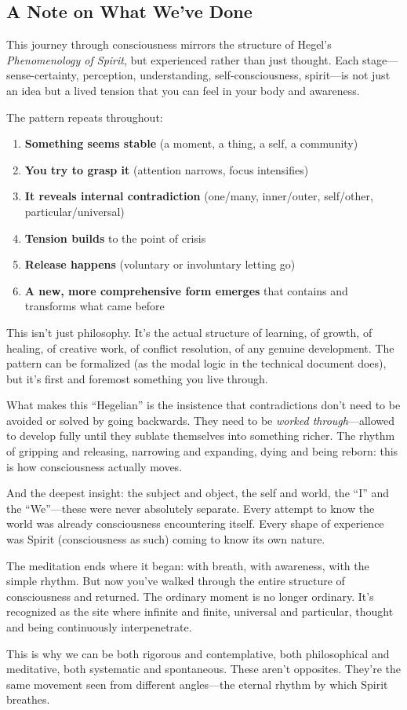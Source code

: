 \subsection{A Note on What We've Done}\label{a-note-on-what-weve-done}

This journey through consciousness mirrors the structure of Hegel's \emph{Phenomenology of Spirit}, but experienced rather than just thought. Each stage---sense-certainty, perception, understanding, self-consciousness, spirit---is not just an idea but a lived tension that you can feel in your body and awareness.

The pattern repeats throughout:

\begin{enumerate}
\def\labelenumi{\arabic{enumi}.}
\tightlist
\item
  \textbf{Something seems stable} (a moment, a thing, a self, a community)
\item
  \textbf{You try to grasp it} (attention narrows, focus intensifies)
\item
  \textbf{It reveals internal contradiction} (one/many, inner/outer, self/other, particular/universal)
\item
  \textbf{Tension builds} to the point of crisis
\item
  \textbf{Release happens} (voluntary or involuntary letting go)
\item
  \textbf{A new, more comprehensive form emerges} that contains and transforms what came before
\end{enumerate}

This isn't just philosophy. It's the actual structure of learning, of growth, of healing, of creative work, of conflict resolution, of any genuine development. The pattern can be formalized (as the modal logic in the technical document does), but it's first and foremost something you live through.

What makes this ``Hegelian'' is the insistence that contradictions don't need to be avoided or solved by going backwards. They need to be \emph{worked through}---allowed to develop fully until they sublate themselves into something richer. The rhythm of gripping and releasing, narrowing and expanding, dying and being reborn: this is how consciousness actually moves.

And the deepest insight: the subject and object, the self and world, the ``I'' and the ``We''---these were never absolutely separate. Every attempt to know the world was already consciousness encountering itself. Every shape of experience was Spirit (consciousness as such) coming to know its own nature.

The meditation ends where it began: with breath, with awareness, with the simple rhythm. But now you've walked through the entire structure of consciousness and returned. The ordinary moment is no longer ordinary. It's recognized as the site where infinite and finite, universal and particular, thought and being continuously interpenetrate.

This is why we can be both rigorous and contemplative, both philosophical and meditative, both systematic and spontaneous. These aren't opposites. They're the same movement seen from different angles---the eternal rhythm by which Spirit breathes.
